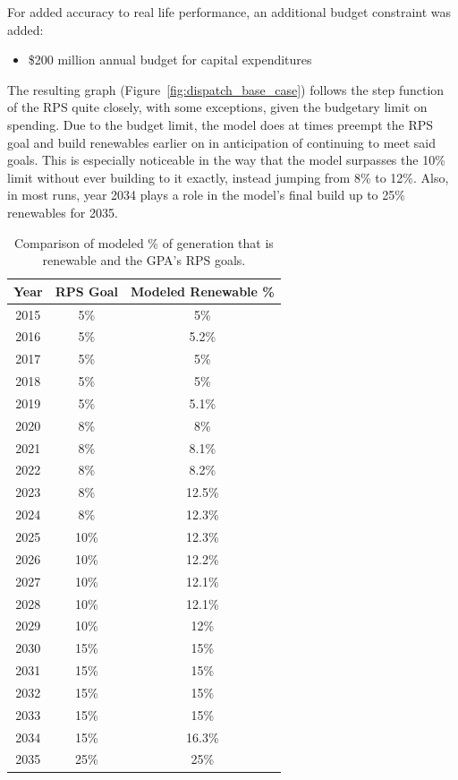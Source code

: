 \documentclass[12pt,letterpaper,fleqn]{article}
\begin{document}
For added accuracy to real life performance, an additional budget
constraint was added:
\begin{itemize}
\item \$200 million annual budget for capital expenditures
\end{itemize}

The resulting graph (Figure~\ref{fig:dispatch_base_case}) follows the
step function of the RPS quite closely, with some exceptions, given
the budgetary limit on spending. Due to the budget limit, the model
does at times preempt the RPS goal and build renewables earlier on in
anticipation of continuing to meet said goals. This is especially
noticeable in the way that the model surpasses the 10\% limit without
ever building to it exactly, instead jumping from 8\% to 12\%. Also,
in most runs, year 2034 plays a role in the model’s final build up to
25\% renewables for 2035.

\begin{table}[!h]
  \begin{center}
    \begin{tabular}{| c | c | c | }
      \hline
      \textbf{Year} & \textbf{RPS Goal} & \textbf{Modeled Renewable
        \%} \\\hline
      2015 & 5\% & 5\% \\\hline
      2016 & 5\% & 5.2\% \\\hline
      2017 & 5\% & 5\% \\\hline
      2018 & 5\% & 5\% \\\hline
      2019 & 5\% & 5.1\% \\\hline
      2020 & 8\% & 8\% \\\hline
      2021 & 8\% & 8.1\% \\\hline
      2022 & 8\% & 8.2\% \\\hline
      2023 & 8\% & 12.5\% \\\hline
      2024 & 8\% & 12.3\% \\\hline
      2025 & 10\% & 12.3\% \\\hline
      2026 & 10\% & 12.2\% \\\hline
      2027 & 10\% & 12.1\% \\\hline
      2028 & 10\% & 12.1\% \\\hline
      2029 & 10\% & 12\% \\\hline
      2030 & 15\% & 15\% \\\hline
      2031 & 15\% & 15\% \\\hline
      2032 & 15\% & 15\% \\\hline
      2033 & 15\% & 15\% \\\hline
      2034 & 15\% & 16.3\% \\\hline
      2035 & 25\% & 25\% \\\hline
    \end{tabular}
  \end{center}
  \caption{Comparison of modeled \% of generation that is renewable
    and the GPA's RPS goals.}
  \label{tab:rps}
\end{table}
\end{document}
